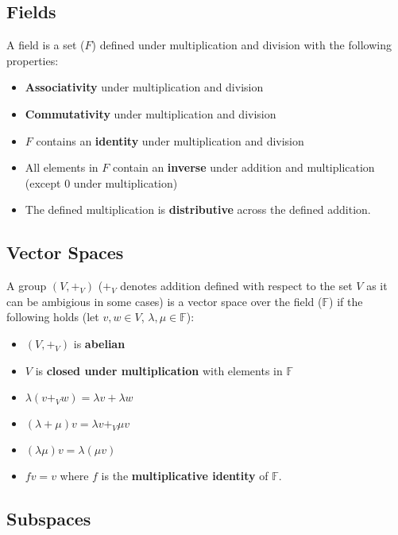 \documentclass[a4paper, 12pt, twoside]{article}
\begin{document}
\subsection{Fields}

A field is a set ($F$) defined under multiplication and division with the
following properties:

\begin{itemize}
  \item \textbf{Associativity} under multiplication and division
  \item \textbf{Commutativity} under multiplication and division
  \item $F$ contains an \textbf{identity} under multiplication and division
  \item All elements in $F$ contain an \textbf{inverse} under addition and
        multiplication (except $0$ under multiplication)
  \item The defined multiplication is \textbf{distributive} across
        the defined addition.
\end{itemize}

\subsection{Vector Spaces}

A group $(V, +_{V})$ ($+_{V}$ denotes addition defined with respect to the
set $V$ as it can be ambigious in some cases) is a vector space over the field
($\mathbb{F}$) if the following holds (let $v, w \in V$, $\lambda, \mu \in
  \mathbb{F}$):

\begin{itemize}
  \item $(V, +_{V})$ is \textbf{abelian}
  \item $V$ is \textbf{closed under multiplication} with elements in
        $\mathbb{F}$
  \item $\lambda(v +_{V} w) = \lambda v + \lambda w$
  \item $(\lambda + \mu)v = \lambda v +_{V} \mu v$
  \item $(\lambda \mu)v = \lambda (\mu v)$
  \item $fv = v$ where $f$ is the \textbf{multiplicative identity} of
        $\mathbb{F}$.
\end{itemize}

\subsection{Subspaces}
\end{document}
